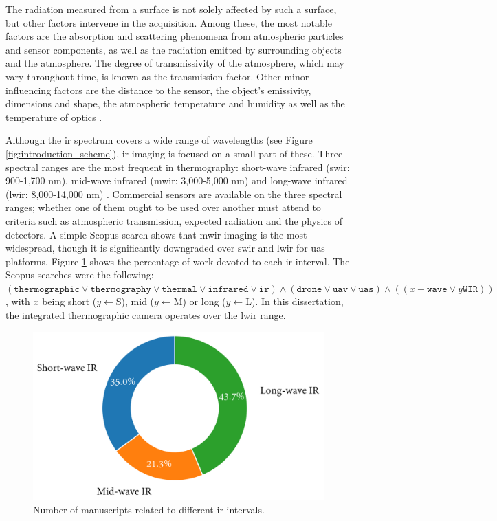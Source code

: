 The radiation measured from a surface is not solely affected by such a surface, but other factors intervene in the acquisition. Among these, the most notable factors are the absorption and scattering phenomena from atmospheric particles and sensor components, as well as the radiation emitted by surrounding objects and the atmosphere. The degree of transmissivity of the atmosphere, which may vary throughout time, is known as the transmission factor. Other minor influencing factors are the distance to the sensor, the object's emissivity, dimensions and shape, the atmospheric temperature and humidity as well as the temperature of optics \cite{vollmer_infrared_2017}. 

Although the \acrshort{ir} spectrum covers a wide range of wavelengths (see Figure \ref{fig:introduction_scheme}), \acrshort{ir} imaging is focused on a small part of these. Three spectral ranges are the most frequent in thermography: short-wave infrared (\acrshort{swir}: 900-1,700 \si{\nano\meter}), mid-wave infrared (\acrshort{mwir}: 3,000-5,000 \si{\nano\meter}) and long-wave infrared (\acrshort{lwir}: 8,000-14,000 \si{\nano\meter}) \cite{gade_thermal_2014, vollmer_infrared_2017}. Commercial sensors are available on the three spectral ranges; whether one of them ought to be used over another must attend to criteria such as atmospheric transmission, expected radiation and the physics of detectors. A simple Scopus search shows that \acrshort{mwir} imaging is the most widespread, though it is significantly downgraded over \acrshort{swir} and \acrshort{lwir} for \acrshort{uas} platforms. Figure \ref{fig:infrared_scopus} shows the percentage of work devoted to each \acrshort{ir} interval. The Scopus searches were the following: $(\mathtt{thermographic} \lor \mathtt{thermography} \lor \mathtt{thermal} \lor \mathtt{infrared} \lor \mathtt{ir}) \land (\mathtt{drone} \lor \mathtt{uav} \lor \mathtt{uas}) \land ((x-\mathtt{wave} \lor y\mathtt{WIR}))$, with $x$ being short ($y \gets $S), mid ($y \gets $M) or long ($y \gets $L). In this dissertation, the integrated thermographic camera operates over the \acrshort{lwir} range. 

\begin{figure}[ht]
	\includegraphics[width=.75\textwidth]{figs/fundamentals/infrared.png}
	\caption{Number of manuscripts related to different \acrshort{ir} intervals.  }
    \label{fig:infrared_scopus}
\end{figure}

